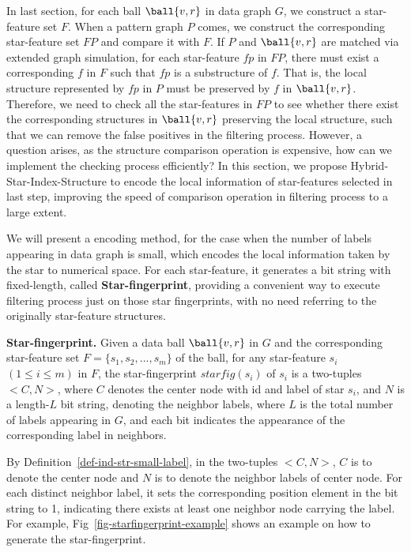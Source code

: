 In last section, for each ball $\ball{v, r}$ in data graph $G$, we construct a star-feature set $F$. When a pattern graph $P$ comes, we construct the corresponding star-feature set $FP$ and compare it with $F$. If $P$ and $\ball{v, r}$ are matched via extended graph simulation, for each star-feature $fp$ in $FP$, there must exist a corresponding $f$ in $F$ such that $fp$ is a substructure of $f$. That is, the local structure represented by $fp$ in $P$ must be preserved by $f$ in $\ball{v, r}$. Therefore, we need to check all the star-features in $FP$ to see whether there exist the corresponding structures in $\ball{v, r}$ preserving the local structure, such that we can remove the false positives in the filtering process. However, a question arises, as the structure comparison operation is expensive, how can we implement the checking process efficiently? In this section, we propose Hybrid-Star-Index-Structure to encode the local information of star-features selected in last step, improving the speed of comparison operation in filtering process to a large extent.


We will present a encoding method, for the case when the number of labels appearing in data graph is small, which encodes the local information taken by the star to numerical space. For each star-feature, it generates a bit string with fixed-length, called \textbf{Star-fingerprint}, providing a convenient way to execute filtering process just on those star fingerprints, with no need referring to the originally star-feature structures.

\begin{definition} {\textbf{Star-fingerprint.}}
\label{def-ind-str-small-label}
Given a data ball $\ball{v, r}$ in $G$ and the corresponding star-feature set $F=\{s_1, s_2,..., s_m\}$ of the ball, for any star-feature $s_i$ $(1 \leq i \leq m)$ in $F$, the star-fingerprint $starfig(s_i)$ of $s_i$ is a two-tuples $<C,N>$, where $C$ denotes the center node with id and label of star $s_i$, and $N$ is a length-$L$ bit string, denoting the neighbor labels, where $L$ is the total number of labels appearing in $G$, and each bit indicates the appearance of the corresponding label in neighbors.
\end{definition}

By Definition~\ref{def-ind-str-small-label}, in the two-tuples $<C,N>$, $C$ is to denote the center node and $N$ is to denote the neighbor labels of center node. For each distinct neighbor label, it sets the corresponding position element in the bit string to 1, indicating there exists at least one neighbor node carrying the label. For example, Fig~\ref{fig-starfingerprint-example} shows an example on how to generate the star-fingerprint.

